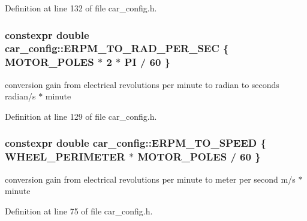 Definition at line 132 of file car\+\_\+config.\+h.

\subsubsection[{\texorpdfstring{E\+R\+P\+M\+\_\+\+T\+O\+\_\+\+R\+A\+D\+\_\+\+P\+E\+R\+\_\+\+S\+EC}{ERPM_TO_RAD_PER_SEC}}]{\setlength{\rightskip}{0pt plus 5cm}constexpr double car\+\_\+config\+::\+E\+R\+P\+M\+\_\+\+T\+O\+\_\+\+R\+A\+D\+\_\+\+P\+E\+R\+\_\+\+S\+EC \{ {\bf M\+O\+T\+O\+R\+\_\+\+P\+O\+L\+ES} $\ast$ 2 $\ast$ {\bf PI} / 60 \}}\hypertarget{namespacecar__config_a877c4a772a47f4737d9f03fe8a22e106}{}\label{namespacecar__config_a877c4a772a47f4737d9f03fe8a22e106}


conversion gain from electrical revolutions per minute to radian to seconds  radian/s $\ast$ minute 



Definition at line 129 of file car\+\_\+config.\+h.

\subsubsection[{\texorpdfstring{E\+R\+P\+M\+\_\+\+T\+O\+\_\+\+S\+P\+E\+ED}{ERPM_TO_SPEED}}]{\setlength{\rightskip}{0pt plus 5cm}constexpr double car\+\_\+config\+::\+E\+R\+P\+M\+\_\+\+T\+O\+\_\+\+S\+P\+E\+ED \{ {\bf W\+H\+E\+E\+L\+\_\+\+P\+E\+R\+I\+M\+E\+T\+ER} $\ast$ {\bf M\+O\+T\+O\+R\+\_\+\+P\+O\+L\+ES} / 60 \}}\hypertarget{namespacecar__config_af33b95798967e7193927782fd91d36ce}{}\label{namespacecar__config_af33b95798967e7193927782fd91d36ce}


conversion gain from electrical revolutions per minute to meter per second  m/s $\ast$ minute 



Definition at line 75 of file car\+\_\+config.\+h.

